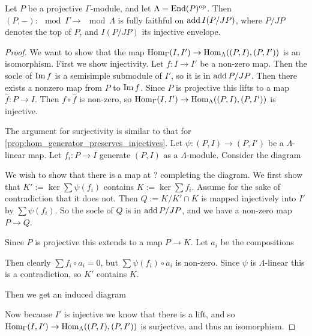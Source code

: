 \begin{prop}
	Let $P$ be a projective $\Gamma$-module, and let $\Lambda = \operatorname{End}(P)^{\operatorname{op}}$. Then $(P, -)\colon\mod \Gamma \to \mod \Lambda$ is fully faithful on $\operatorname{add} I(P/JP)$, where $P/JP$ denotes the top of $P$, and $I(P/JP)$ its injective envelope.
	\begin{proof}
		We want to show that the map $\operatorname{Hom}_\Gamma(I, I') \to \operatorname{Hom}_\Lambda((P,I), (P, I'))$ is an isomorphism. First we show injectivity. Let $f\colon I\to I'$ be a non-zero map. Then the socle of $\operatorname{Im} f$ is a semisimple submodule of $I'$, so it is in $\operatorname{add} P/JP$. Then there exists a nonzero map from $P$ to $\operatorname{Im} f$. Since $P$ is projective this lifts to a map $\hat{f}\colon P\to I$. Then $f \circ \hat{f}$ is non-zero, so $\operatorname{Hom}_\Gamma(I, I') \to \operatorname{Hom}_\Lambda((P,I), (P, I'))$ is injective.
		
		The argument for surjectivity is similar to that for \cref{prop:hom_generator_preserves_injectives}. Let $\psi\colon(P,I)\to (P, I')$ be a $\Lambda$-linear map. Let $f_i\colon P\to I$ generate $(P,I)$ as a $\Lambda$-module. Consider the diagram
		\begin{center}
		\end{center}
		We wish to show that there is a map at ? completing the diagram. We first show that $K':=\ker \sum \psi(f_i)$ contains $K:=\ker \sum f_i$. Assume for the sake of contradiction that it does not. Then $Q := K / K' \cap K$ is mapped injectively into $I'$ by $\sum \psi(f_i)$. So the socle of $Q$ is in $\operatorname{add} P/JP$, and we have a non-zero map $P \to Q$.
		
		Since $P$ is projective this extends to a map $P \to K$. Let $a_i$ be the compositions 
		Then clearly $\sum f_i \circ a_i = 0$, but $\sum \psi(f_i) \circ a_i$ is non-zero. Since $\psi$ is $\Lambda$-linear this is a contradiction, so $K'$ contains $K$.
		
		Then we get an induced diagram
		\begin{center}
		\end{center}
		Now because $I'$ is injective we know that there is a lift, and so $\operatorname{Hom}_\Gamma(I, I') \to \operatorname{Hom}_\Lambda((P,I), (P, I'))$ is surjective, and thus an isomorphism.
	\end{proof} 
\end{prop}

